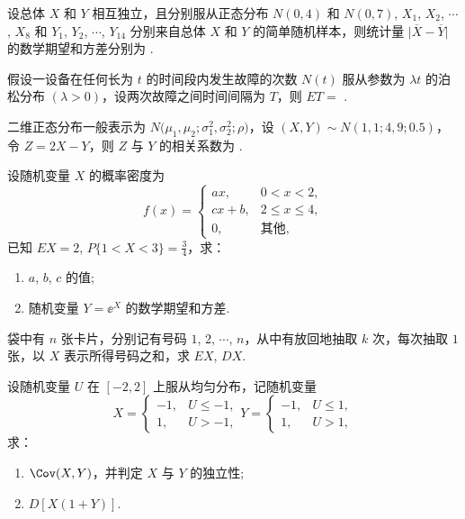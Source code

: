 	\begin{titwo}
		设总体 $X$ 和 $Y$ 相互独立，且分别服从正态分布 $N(0,4)$ 和 $N(0,7)$, $X_{1}$, $X_{2}$, $\cdots$, $X_{8}$ 和 $Y_{1}$, $Y_{2}$, $\cdots$, $Y_{14}$ 分别来自总体 $X$ 和 $Y$ 的简单随机样本，则统计量 $\bigl| \overline{X} - \overline{Y} \bigr|$ 的数学期望和方差分别为 \htwo.
	\end{titwo}

	\begin{titwo}
		假设一设备在任何长为 $t$ 的时间段内发生故障的次数 $N(t)$ 服从参数为 $\lambda t$ 的泊松分布 $(\lambda > 0)$，设两次故障之间时间间隔为 $T$，则 $ET = $ \htwo.
	\end{titwo}

	\begin{titwo}
		二维正态分布一般表示为 $N \bigl( \mu_{1},\mu_{2};\sigma_{1}^{2},\sigma_{2}^{2};\rho \bigr)$，设 $(X,Y) \sim N(1,1;4,9;0.5)$，令 $Z = 2X - Y$，则 $Z$ 与 $Y$ 的相关系数为 \htwo.
	\end{titwo}

	\begin{titwo}
		设随机变量 $X$ 的概率密度为
		\[
			f(x) = \begin{cases}
				ax, & 0 < x < 2, \\
				cx + b, & 2 \leq x \leq 4, \\
				0, & \text{其他},
			\end{cases}
		\]
		已知 $EX = 2$, $P\{1 < X < 3\} = \frac{3}{4}$，求：
		\begin{enumerate}
			\item $a$, $b$, $c$ 的值;
			\item 随机变量 $Y = \ee^{X}$ 的数学期望和方差.
		\end{enumerate}
	\end{titwo}

	\begin{titwo}
		袋中有 $n$ 张卡片，分别记有号码 $1$, $2$, $\cdots$, $n$，从中有放回地抽取 $k$ 次，每次抽取 $1$ 张，以 $X$ 表示所得号码之和，求 $EX$, $DX$.
	\end{titwo}

	\begin{titwo}
		设随机变量 $U$ 在 $[-2,2]$ 上服从均匀分布，记随机变量
		\[
			X = \begin{cases}
				-1, & U \leq -1, \\
				1, & U > -1,
			\end{cases}
			Y = \begin{cases}
				-1, & U \leq 1, \\
				1, & U > 1,
			\end{cases}
		\]
		求：
		\begin{enumerate}
			\item $\Cov(X,Y)$，并判定 $X$ 与 $Y$ 的独立性;
			\item $D[X(1 + Y)]$.
		\end{enumerate}
	\end{titwo}

